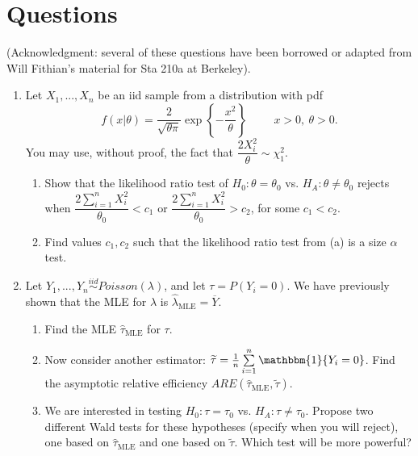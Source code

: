 \documentclass[11pt]{article}
\begin{document}
\newpage

\section*{Questions}

(Acknowledgment: several of these questions have been borrowed or adapted from Will Fithian's material for Sta 210a at Berkeley).

\begin{enumerate}

\item Let $X_1,...,X_n$ be an iid sample from a distribution with pdf
$$f(x|\theta) = \frac{2}{\sqrt{\theta \pi}} \exp \left\lbrace -\frac{x^2}{\theta} \right\rbrace \hspace{1cm} x > 0, \ \theta > 0.$$
You may use, without proof, the fact that $\dfrac{2 X_i^2}{\theta} \sim \chi^2_1$.

\begin{enumerate}
\item Show that the likelihood ratio test of $H_0: \theta = \theta_0$ vs. $H_A: \theta \neq \theta_0$ rejects when $\dfrac{2 \sum \limits_{i=1}^n X_i^2}{\theta_0} < c_1$ or $\dfrac{2 \sum \limits_{i=1}^n X_i^2}{\theta_0} > c_2$, for some $c_1 < c_2$.

\item Find values $c_1, c_2$ such that the likelihood ratio test from (a) is a size $\alpha$ test.
\end{enumerate}

\bigskip

\item Let $Y_1,...,Y_n \overset{iid}{\sim} Poisson(\lambda)$, and let $\tau = P(Y_i = 0)$. We have previously shown that the MLE for $\lambda$ is $\widehat{\lambda}_{\text{MLE}} = \overline{Y}$.

\begin{enumerate}
\item Find the MLE $\widehat{\tau}_{\text{MLE}}$ for $\tau$.
\item Now consider another estimator: $\widetilde{\tau} = \frac{1}{n} \sum \limits_{i=1}^n \mathbbm{1}\{Y_i = 0 \}$. Find the asymptotic relative efficiency $ARE(\widehat{\tau}_{\text{MLE}}, \widetilde{\tau})$.
\item We are interested in testing $H_0: \tau = \tau_0$ vs. $H_A: \tau \neq \tau_0$. Propose two different Wald tests for these hypotheses (specify when you will reject), one based on $\widehat{\tau}_{\text{MLE}}$ and one based on $\widetilde{\tau}$. Which test will be more powerful?
\end{enumerate}


\end{enumerate}
\end{document}
